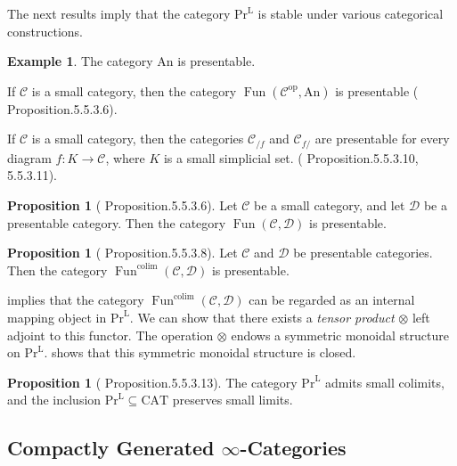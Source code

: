 \documentclass[a4paper,dvipdfmx,11pt,reqno]{amsart}
\DeclareMathOperator{\myop}{op}
\DeclareMathOperator*{\colim}{colim}
\DeclareMathOperator{\Fun}{Fun}
\newcommand{\C}{\mathcal{C}}
\newcommand{\D}{\mathcal{D}}
\newcommand{\An}{\mathrm{An}}
\newcommand{\CAT}{\mathrm{CAT}}
\newcommand{\PrL}{\mathrm{Pr}^{\mathrm{L}}}
\theoremstyle{definition}
\newtheorem{example}[theorem]{Example}
\newtheorem{lemma}[theorem]{Lemma}
\newtheorem{proposition}[theorem]{Proposition}
\begin{document}
The next results imply that the category $\PrL$ is stable under various categorical constructions.

\begin{example}
  The category $\An$ is presentable.

  If $\C$ is a small category, then the category $\Fun(\C^{\myop},\An)$ is presentable (\cite{HTT} Proposition.5.5.3.6).

  If $\C$ is a small category, then the categories $\C_{/f}$ and $\C_{f/}$ are presentable for every diagram $f : K \to \C$, where $K$ is a small simplicial set. (\cite{HTT} Proposition.5.5.3.10, 5.5.3.11).
\end{example}

\begin{proposition}[\cite{HTT} Proposition.5.5.3.6] \label{HTT.5.5.3.6}
  Let $\C$ be a small category, and let $\D$ be a presentable category.
  Then the category $\Fun(\C,\D)$ is presentable.
\end{proposition}

\begin{proposition}[\cite{HTT} Proposition.5.5.3.8] \label{HTT.5.5.3.8}
  Let $\C$ and $\D$ be presentable categories.
  Then the category $\Fun^{\colim}(\C,\D)$ is presentable.
\end{proposition}

 implies that the category $\Fun^{\colim}(\C,\D)$ can be regarded as an internal mapping object in $\PrL$.
We can show that there exists a \textit{tensor product} $\otimes$ left adjoint to this functor.
The operation $\otimes$ endows a symmetric monoidal structure on $\PrL$.
 shows that this symmetric monoidal structure is closed.


\begin{proposition}[\cite{HTT} Proposition.5.5.3.13] \label{HTT.5.5.3.13}
  The category $\PrL$ admits small colimits, and the inclusion $\PrL \subseteq \CAT$ preserves small limits.
\end{proposition}

\subsection{Compactly Generated \texorpdfstring{$\infty$}{infty}-Categories}
\end{document}
